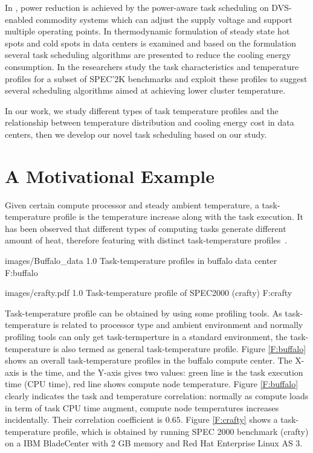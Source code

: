 In \cite{DBLP:conf/ccgrid/KimBK07,DBLP:conf/sc/GeFC05},  power reduction is achieved by the power-aware task scheduling on DVS-enabled commodity systems which can adjust the supply voltage and support multiple operating points. In \cite{DBLP:conf/cluster/TangGV07,DBLP:conf/usenix/MooreCRS05} thermodynamic formulation of steady state hot spots and cold spots in data centers is examined and based on the formulation several task scheduling algorithms are presented to reduce the cooling energy consumption. In \cite{DBLP:conf/aPcsac/VandersterBD07} the researchers study the task characteristics and temperature profiles for a subset of SPEC'2K benchmarks and exploit these profiles to suggest several scheduling algorithms aimed at achieving lower cluster temperature.

In our work, we study different types of task temperature profiles and the relationship between temperature distribution and cooling energy cost in data centers, then we develop our novel task scheduling based on our study.
 
\section{A Motivational Example}

Given certain compute processor and steady ambient  temperature, a task-temperature profile is the temperature increase along with the task execution. 
It has been observed that different types of computing tasks generate different amount of heat, 
therefore featuring with distinct task-temperature profiles~\cite{DBLP:conf/aPcsac/VandersterBD07}. 

 {images/Buffalo_data}
  {1.0}
 {Task-temperature profiles in buffalo data center}
 {F:buffalo}

 {images/crafty.pdf}
  {1.0}
 { Task-temperature profile of SPEC2000 (crafty)}
 {F:crafty}
 

Task-temperature profile can be obtained by using some profiling tools. 
As task-temperature is related to processor type and ambient environment and normally profiling tools 
can only get task-termperture in a standard environment, 
the task-temperature is also termed as general task-temperature profile. 
Figure \ref{F:buffalo} shows an overall task-temperature profiles in the buffalo compute center. 
The X-axis is the time,  and the Y-axis gives two values: green line is the task execution time (CPU time), red line shows compute node temperature. 
Figure \ref{F:buffalo} clearly  indicates the task and temperature correlation: 
normally as compute loads in term of task CPU time augment,   compute node temperatures  increases incidentally. 
Their correlation coefficient is $0.65$. 
Figure \ref{F:crafty} shows a task-temperature profile, 
which is obtained  by running SPEC 2000 benchmark (crafty) on a IBM BladeCenter 
with 2 GB memory and Red Hat Enterprise Linux AS 3.

